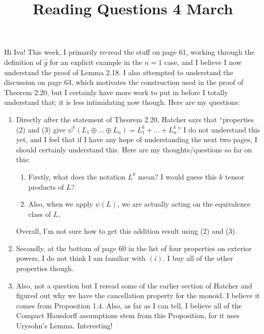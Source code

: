 \documentclass[12]{amsart}
\title{Reading Questions 4 March}
\begin{document}
\maketitle

Hi Iva! This week, I primarily re-read the stuff on page 61, working through the definition of $\hat{g}$ for an explicit example in the $n=1$ case, and I believe I now understand the proof of Lemma 2.18. I also attempted to understand the discussion on page 63, which motivates the construction used in the proof of Theorem 2.20, but I certainly have more work to put in before I totally understand that; it is less intimidating now though. Here are my questions:

\begin{enumerate}
	\item Directly after the statement of Theorem 2.20, Hatcher says that ``properties (2) and (3) give $\psi^{k}(L_1 \oplus \dots \oplus L_n) = L_1^k + \dots + L_n^k$.'' I do not understand this yet, and I feel that if I have any hope of understanding the next two pages, I should certainly understand this. Here are my thoughts/questions so far on this:
	\begin{enumerate}
		\item Firstly, what does the notation $L^k$ mean? I would guess this $k$ tensor products of $L$?
		\item Also, when we apply $\psi(L)$, we are actually acting on the equivalence class of $L$.
	\end{enumerate}
	Overall, I'm not sure how to get this addition result using (2) and (3).
	\item Secondly, at the bottom of page 60 in the list of four properties on exterior powers, I do not think I am familiar with $(i)$. I buy all of the other properties though.
	\item Also, not a question but I reread some of the earlier section of Hatcher and figured out why we have the cancellation property for the monoid. I believe it comes from Proposition 1.4. Also, as far as I can tell, I believe all of the Compact Hausdorff assumptions stem from this Proposition, for it uses Urysohn’s Lemma. Interesting! 
\end{enumerate}
\end{document}
